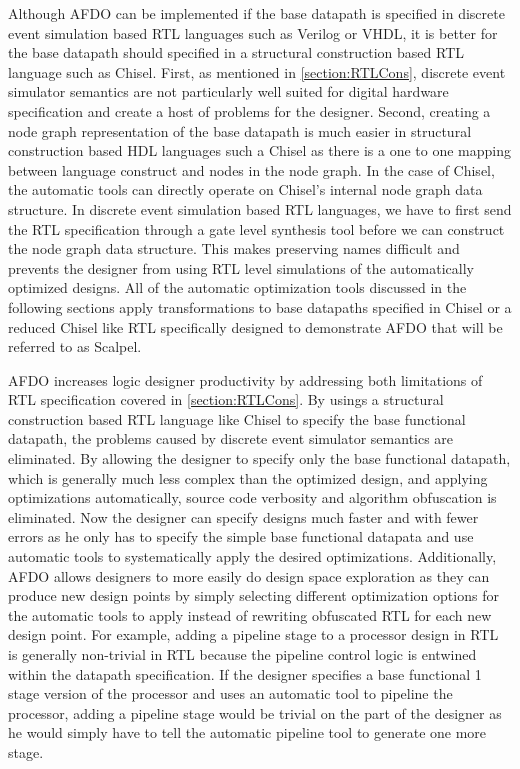 Although AFDO can be implemented if the base datapath is specified in discrete event simulation based RTL languages such as Verilog or VHDL, it is better for the base datapath should specified in a structural construction based RTL language such as Chisel. First, as mentioned in \ref{section:RTLCons}, discrete event simulator semantics are not particularly well suited for digital hardware specification and create a host of problems for the designer. Second, creating a node graph representation of the base datapath is much easier in structural construction based HDL languages such a Chisel as there is a one to one mapping between language construct and nodes in the node graph. In the case of Chisel, the automatic tools can directly operate on Chisel’s internal node graph data structure. In discrete event simulation based RTL languages, we have to first send the RTL specification through a gate level synthesis tool before we can construct the node graph data structure. This makes preserving names difficult and prevents the designer from using RTL level simulations of the automatically optimized designs. All of the automatic optimization tools discussed in the following sections apply transformations to base datapaths specified in Chisel or a reduced Chisel like RTL specifically designed to demonstrate AFDO that will be referred to as Scalpel.

AFDO increases logic designer productivity by addressing both limitations of RTL specification covered in \ref{section:RTLCons}. By usings a structural construction based RTL language like Chisel to specify the base functional datapath, the problems caused by discrete event simulator semantics are eliminated. By allowing the designer to specify only the base functional datapath, which is generally much less complex than the optimized design, and applying optimizations automatically, source code verbosity and algorithm obfuscation is eliminated. Now the designer can specify designs much faster and with fewer errors as he only has to specify the simple base functional datapata and use automatic tools to systematically apply the desired optimizations. Additionally, AFDO allows designers to more easily do design space exploration as they can produce new design points by simply selecting different optimization options for the automatic tools to apply instead of rewriting obfuscated RTL for each new design point. For example, adding a pipeline stage to a processor design in RTL is generally non-trivial in RTL because the pipeline control logic is entwined within the datapath specification. If the designer specifies a base functional 1 stage version of the processor and uses an automatic tool to pipeline the processor, adding a pipeline stage would be trivial on the part of the designer as he would simply have to tell the automatic pipeline tool to generate one more stage.

